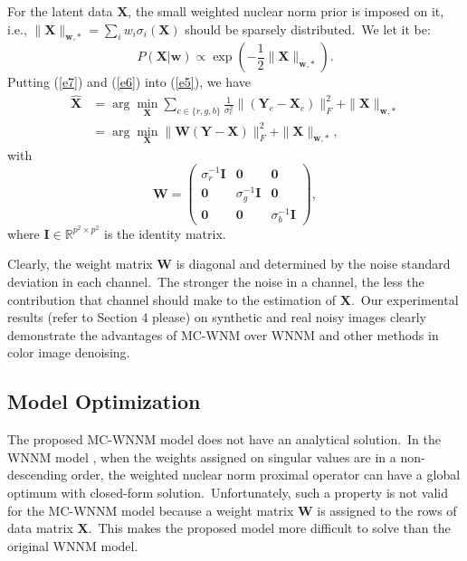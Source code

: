 For the latent data $\mathbf{X}$, the small weighted nuclear norm prior is imposed on it, i.e., $\|\mathbf{X}\|_{\bm{w},*}=\sum_{i}w_{i}\sigma_{i}(\mathbf{X})$ should be sparsely distributed.\ We let it be:
\begin{equation}
\label{e7}
P(\mathbf{X}|\bm{w})
\propto
\exp(-\frac{1}{2}\|\mathbf{X}\|_{\bm{w},*}).
\end{equation}
Putting (\ref{e7}) and (\ref{e6}) into (\ref{e5}), we have
\begin{equation}
\label{e8}
\begin{split}
\hat{\mathbf{X}}
&
=
\arg\min_{\mathbf{X}}
\sum_{c\in\{r, g, b\}}
\frac{1}{\sigma_{c}^{2}}\|(\mathbf{Y}_{c}-\mathbf{X}_{c})\|_{F}^{2}+\|\mathbf{X}\|_{\bm{w},*}
\\
&
=
\arg\min_{\mathbf{X}}\|\mathbf{W}(\mathbf{Y}-\mathbf{X})\|_{F}^{2}+\|\mathbf{X}\|_{\bm{w},*},
\end{split}
\end{equation}
with
\begin{equation}
\label{e9}
\mathbf{W}
=
\left( \begin{array}{ccc}
\sigma_{r}^{-1}\mathbf{I} & \mathbf{0} & \mathbf{0}
\\
\mathbf{0} & \sigma_{g}^{-1}\mathbf{I} & \mathbf{0}
\\
\mathbf{0} & \mathbf{0} & \sigma_{b}^{-1}\mathbf{I}
\end{array} \right),
\end{equation}
where $\mathbf{I}
\in\mathbb{R}^{p^{2}\times p^{2}}$ is the identity matrix. 

Clearly, the weight matrix $\mathbf{W}$ is diagonal and determined by the noise standard deviation in each channel.\ The stronger the noise in a channel, the less the contribution that channel should make to the estimation of $\mathbf{X}$.\ Our experimental results (refer to Section 4 please) on synthetic and real noisy images clearly demonstrate the advantages of MC-WNM over WNNM and other methods in color image denoising. 

\subsection{Model Optimization}

The proposed MC-WNNM model does not have an analytical solution.\ In the WNNM model \cite{wnnmijcv}, when the weights assigned on singular values are in a non-descending order, the weighted nuclear norm proximal operator can have a global optimum with closed-form solution.\ Unfortunately, such a property is not valid for the MC-WNNM model because a weight matrix $\mathbf{W}$ is assigned to the rows of data matrix $\mathbf{X}$.\ This makes the proposed model more difficult to solve than the original WNNM model.

